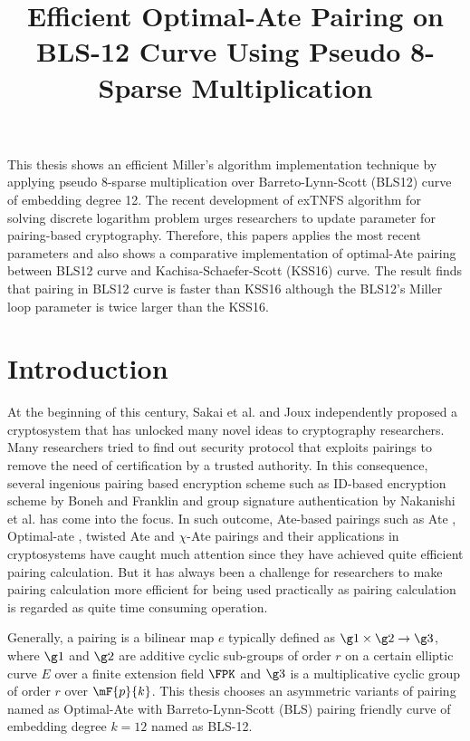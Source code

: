 \title{Efficient Optimal-Ate Pairing on BLS-12 Curve Using Pseudo 8-Sparse Multiplication}

This thesis shows an efficient Miller's algorithm implementation technique by applying pseudo 8-sparse multiplication over Barreto-Lynn-Scott (BLS12) curve of embedding degree 12. The recent development of exTNFS algorithm for solving discrete logarithm problem urges researchers to update parameter for pairing-based cryptography. Therefore, this papers applies the most recent parameters and also shows a comparative implementation of optimal-Ate pairing between BLS12 curve and  Kachisa-Schaefer-Scott (KSS16) curve. The result finds that pairing in BLS12 curve is faster than KSS16 although the BLS12's Miller loop parameter is twice larger than the KSS16.


\section{Introduction}
At the beginning of this century, Sakai et al. \cite{sakai2000cryptosystems} and Joux \cite{JC:Joux04} independently proposed a cryptosystem that has unlocked many novel ideas to cryptography researchers. 
Many researchers tried to find out security protocol that exploits pairings to remove the need of certification by a trusted authority. 
In this consequence, several ingenious pairing based encryption scheme such as ID-based encryption scheme by  Boneh and Franklin \cite{sakai2000cryptosystems} and group signature authentication by Nakanishi et al. \cite{AC:NakFun05} has come into the focus. 
In such outcome, Ate-based pairings such as Ate \cite{DBLP:reference/crc/2005ehcc}, Optimal-ate \cite{DBLP:journals/tit/Vercauteren10}, twisted Ate \cite{EPRINT:MKHO07} and $\chi$-Ate \cite{PAIRING:NASKM08} pairings and their applications in cryptosystems have caught much attention since they have achieved quite efficient pairing calculation.
But it has always been a challenge for researchers to make pairing calculation more efficient for being used practically as pairing calculation is regarded as quite time consuming operation. 

Generally, a pairing is a bilinear map $e$ typically defined as  $\g1 \times \g2 \to \g3$, where $\g1$ and $\g2$ are additive cyclic sub-groups of  order $r$  on a certain elliptic curve $E$ over a finite extension field $\FPK$ and $\g3$ is a multiplicative cyclic group of order $r$ over $\mF{p}{k}$.
This thesis chooses an asymmetric variants of pairing named as Optimal-Ate \cite{DBLP:journals/tit/Vercauteren10} with Barreto-Lynn-Scott (BLS) \cite{SCN:BarLynSco02} pairing friendly curve of embedding degree $k=12$ named as BLS-12.

